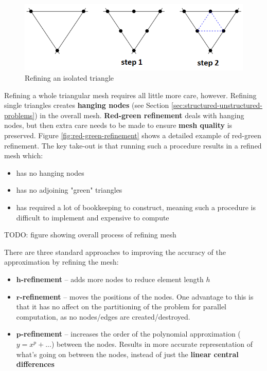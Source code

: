 \documentclass{article}
\begin{document}
\begin{figure}
	\centering
	\includegraphics[scale=0.6]{figures/single-mesh-triangulation.png}
	\caption{Refining an isolated triangle}
	\label{fig:isolated-triangle-refinement}
\end{figure}

Refining a whole triangular mesh requires all little more care, however. Refining single triangles creates \textbf{hanging nodes} (see Section \ref{sec:structured-unstructured-problems}) in the overall mesh. \textbf{Red-green refinement} deals with hanging nodes, but then extra care needs to be made to ensure \textbf{mesh quality} is preserved. Figure \ref{fig:red-green-refinement} shows a detailed example of red-green refinement. The key take-out is that running such a procedure results in a refined mesh which:
\begin{itemize}
	\item has no hanging nodes
	\item has no adjoining "green" triangles
	\item has required a lot of bookkeeping to construct, meaning such a procedure is difficult to implement and expensive to compute
\end{itemize}

TODO: figure showing overall process of refining mesh

There are three standard approaches to improving the accuracy of the approximation by refining the mesh:
\begin{itemize}
	\item \textbf{$\mathbf{h}$-refinement} -- adds more nodes to reduce element length $h$
	\item \textbf{$\mathbf{r}$-refinement} -- moves the positions of the nodes. One advantage to this is that it has no affect on the partitioning of the problem for parallel computation, as no nodes/edges are created/destroyed.
	\item \textbf{$\mathbf{p}$-refinement} -- increases the order of the polynomial approximation ($y = x^p + ...$) between the nodes. Results in more accurate representation of what's going on between the nodes, instead of just the \textbf{linear central differences}
\end{itemize}
\end{document}
